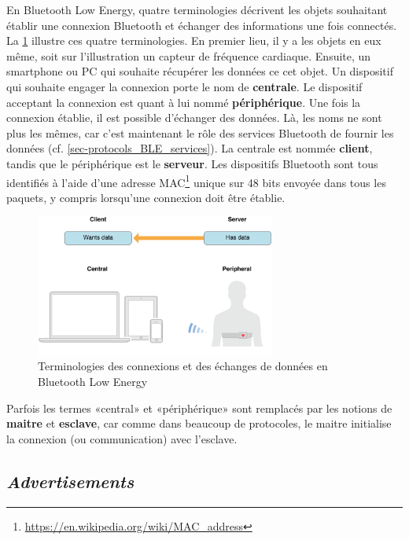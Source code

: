 En Bluetooth Low Energy, quatre terminologies décrivent les objets souhaitant établir une connexion Bluetooth et échanger des informations une fois connectés. La \cref{fig-central_vs_peripheral} illustre ces quatre terminologies. En premier lieu, il y a les objets en eux même, soit sur l'illustration un capteur de fréquence cardiaque. Ensuite, un smartphone ou PC qui souhaite récupérer les données ce cet objet. Un dispositif qui souhaite engager la connexion porte le nom de \textbf{centrale}. Le dispositif acceptant la connexion est quant à lui nommé \textbf{périphérique}. Une fois la connexion établie, il est possible d'échanger des données. Là, les noms ne sont plus les mêmes, car c'est maintenant le rôle des services Bluetooth de fournir les données (cf. \cref{sec-protocols_BLE_services}). La centrale est nommée \textbf{client}, tandis que le périphérique est le \textbf{serveur}. Les dispositifs Bluetooth sont tous identifiés à l'aide d'une adresse MAC\footnote{\url{https://en.wikipedia.org/wiki/MAC_address}} unique sur 48 bits envoyée dans tous les paquets, y compris lorsqu'une connexion doit être établie. \\

\begin{figure}[ht!]
    \centering
    \includegraphics[width=0.7\textwidth]{Figures/Protocols/Bluetooth/central_vs_peripheral.png}
    \caption{Terminologies des connexions et des échanges de données en Bluetooth Low Energy}
    \label{fig-central_vs_peripheral}
\end{figure}

Parfois les termes «central» et «périphérique» sont remplacés par les notions de \textbf{maitre} et \textbf{esclave}, car comme dans beaucoup de protocoles, le maitre initialise la connexion (ou communication) avec l'esclave.

\subsection{\textit{Advertisements}}
\label{sec-protocol_ble_adv}


